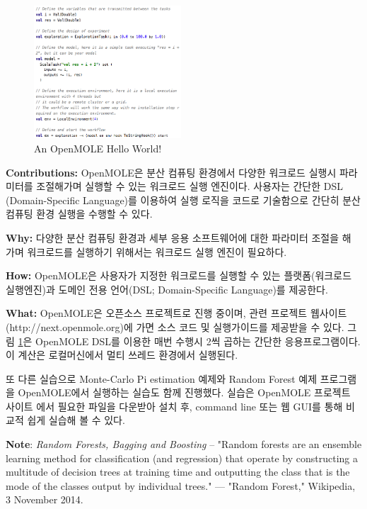 \documentclass[twocolumn]{article}
\begin{document}
\begin{figure}[htb]
        \centering
        \includegraphics[width=0.49\textwidth]{openmole-code.png}
        \caption{An OpenMOLE Hello World!}
        \label{fig:openmole-code}
\end{figure}

\noindent
\textbf{Contributions:} OpenMOLE은 분산 컴퓨팅 환경에서 다양한 워크로드 실행시 파라미터를 조절해가며 실행할 수 있는 워크로드 실행 엔진이다. 
사용자는 간단한 DSL (Domain-Specific Language)를 이용하여 실행 로직을 코드로 기술함으로 간단히 분산 컴퓨팅 환경 실행을 수행할 수 있다.

\noindent
\textbf{Why:} 다양한 분산 컴퓨팅 환경과 세부 응용 소프트웨어에 대한 파라미터 조절을 해 가며 워크로드를 실행하기 위해서는 워크로드 실행 엔진이 필요하다.

\noindent
\textbf{How:} OpenMOLE은 사용자가 지정한 워크로드를 실행할 수 있는 플랫폼(워크로드 실행엔진)과 도메인 전용 언어(DSL; Domain-Specific Language)를 제공한다.

\noindent
\textbf{What:} OpenMOLE은 오픈소스 프로젝트로 진행 중이며, 관련 프로젝트 웹사이트 (http://next.openmole.org)에 가면 소스 코드 및 실행가이드를 제공받을 수 있다. 그림 \ref{fig:openmole-code}은 OpenMOLE DSL를 이용한 매번 수행시 2씩 곱하는 간단한 응용프로그램이다. 이 계산은 로컬머신에서 멀티 쓰레드 환경에서 실행된다.

또 다른 실습으로 Monte-Carlo Pi estimation 예제와 Random Forest 예제 프로그램을 OpenMOLE에서 실행하는 실습도 함께 진행했다. 실습은 OpenMOLE 프로젝트 사이트 \cite{openmole:2015}에서 필요한 파일을 다운받아 설치 후, command line 또는 웹 GUI를 통해 비교적 쉽게 실습해 볼 수 있다.

\noindent
\textbf{Note}: \textit{Random Forests, Bagging and Boosting} --
"Random forests are an ensemble learning method for classification (and regression) that operate by constructing a multitude of decision trees at training time and outputting the class that is the mode of the classes output by individual trees." — "Random Forest," Wikipedia, 3 November 2014.
\end{document}
